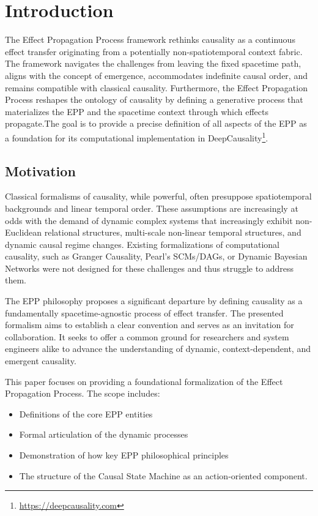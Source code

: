 
\section{Introduction}
\label{sec:formalization_introduction}

The Effect Propagation Process framework rethinks causality as a continuous effect transfer originating from a potentially non-spatiotemporal context fabric. The framework navigates the challenges from leaving the fixed spacetime path, aligns with the concept of emergence, accommodates indefinite causal order, and remains compatible with classical causality. Furthermore, the Effect Propagation Process reshapes the ontology of causality by defining a generative process that materializes the EPP and the spacetime context through which effects propagate.The goal is to provide a precise definition of all aspects of the EPP as a foundation for  its computational implementation in DeepCausality\footnote{\url{https://deepcausality.com}}.

\subsection{Motivation}
\label{sec:formal_intro_motivation}

Classical formalisms of causality, while powerful, often presuppose spatiotemporal backgrounds and linear temporal order. 
These assumptions are increasingly at odds with the demand of dynamic complex systems that increasingly exhibit
non-Euclidean relational structures, multi-scale non-linear temporal structures, and dynamic causal regime changes. 
Existing formalizations of computational causality, such as Granger Causality, Pearl's SCMs/DAGs, or Dynamic Bayesian Networks
were not designed for these challenges and thus struggle to address them. 

The EPP philosophy proposes a significant departure by defining causality as a fundamentally spacetime-agnostic process of effect transfer. The presented formalism aims to establish a clear convention and serves as an invitation for collaboration. It seeks to offer a common ground for researchers and system engineers alike to advance the understanding of dynamic, context-dependent, and emergent causality.

This paper focuses on providing a foundational formalization of the Effect Propagation Process. The scope includes:
\begin{itemize}
    \setlength\itemsep{0em}
    \item Definitions of the core EPP entities
    \item Formal articulation of the dynamic processes
    \item Demonstration of how key EPP philosophical principles
    \item The structure of the Causal State Machine as an action-oriented component.
\end{itemize}

